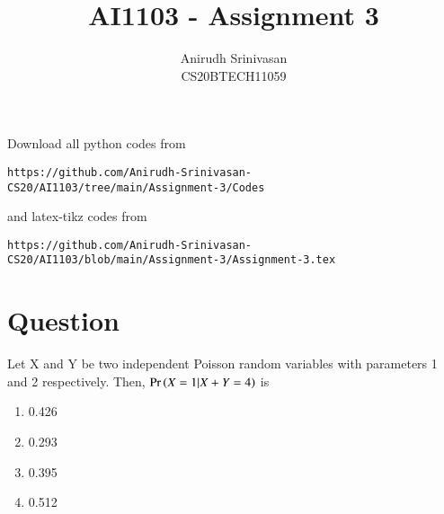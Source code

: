 \documentclass[journal,12pt,twocolumn]{IEEEtran}
\begin{document}
\vspace{3cm}
\title{AI1103 - Assignment 3}
\author{Anirudh Srinivasan\\CS20BTECH11059}
\maketitle
\newpage
\bigskip
\renewcommand{\thefigure}{\theenumi}
\renewcommand{\thetable}{\theenumi}
Download all python codes from 
\begin{lstlisting}
https://github.com/Anirudh-Srinivasan-CS20/AI1103/tree/main/Assignment-3/Codes
\end{lstlisting}
%
and latex-tikz codes from 
%
\begin{lstlisting}
https://github.com/Anirudh-Srinivasan-CS20/AI1103/blob/main/Assignment-3/Assignment-3.tex
\end{lstlisting}
\section*{Question}
Let X and Y be two independent Poisson random variables with parameters 1 and 2 respectively. Then, $\Pr\left(X=1 | X+Y = 4\right)$ is 
\begin{enumerate}[label=\Alph*)]
    \item 0.426
    \item 0.293
    \item 0.395
    \item 0.512
\end{enumerate}
\end{document}
